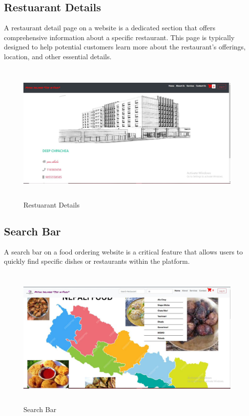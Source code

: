 \subsection{Restuarant Details}
A restaurant detail page on a website is a dedicated section that offers comprehensive information about a specific restaurant. This page is typically designed to help potential customers learn more about the restaurant's offerings, location, and other essential details. 
\begin{figure}[h]
    \centering
    \includegraphics[height=7cm]{img/Graphics/hotel detail ui.JPG}
    \caption{Restuarant Details}
\end{figure}

\subsection{Search Bar}
A search bar on a food ordering website is a critical feature that allows users to quickly find specific dishes or restaurants within the platform. 
\begin{figure}[h]
    \centering
    \includegraphics[height=7cm]{img/Graphics/search bar ui.JPG}
    \caption{Search Bar}
\end{figure}

